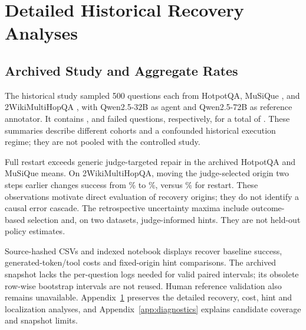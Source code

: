 \documentclass{article}
\begin{document}
\section{Detailed Historical Recovery Analyses}\label{app:historical_results}
\subsection{Archived Study and Aggregate Rates}
The historical study sampled 500 questions each from HotpotQA, MuSiQue
\citep{trivedi2022musique}, and 2WikiMultiHopQA \citep{ho2020constructing},
with Qwen2.5-32B as agent and Qwen2.5-72B as reference annotator. It contains
\HotpotFailed{}, \MusiqueFailed{} and \WikiFailed{} failed questions,
respectively, for a total of \TotalFailed{}. These summaries describe
different cohorts and a confounded historical execution regime; they are
not pooled with the controlled study.

\begin{table}[t]
\centering
\caption{Archived mean repair success (\%). Judge-targeted rows use the generic
retry hint. The last row is a retrospective maximum over the evaluated
uncertainty grid, including informed variants; it is not a held-out policy.
Historical budgets require auditing, and valid confidence intervals are pending.}
\label{tab:results}
\small

\end{table}

Full restart exceeds generic judge-targeted repair in the archived HotpotQA
and MuSiQue means. On 2WikiMultiHopQA, moving the judge-selected origin two
steps earlier changes success from \WikiJudge\% to \WikiBacktrack\%,
versus \WikiRestart\% for restart. These observations motivate direct
evaluation of recovery origins; they do not identify a causal error cascade.
The retrospective uncertainty maxima include outcome-based selection and,
on two datasets, judge-informed hints. They are not held-out policy estimates.

Source-hashed CSVs and indexed notebook displays recover baseline success,
generated-token/tool costs and fixed-origin hint comparisons. The archived
snapshot lacks the per-question logs needed for valid paired intervals;
its obsolete row-wise bootstrap intervals are not reused. Human reference
validation also remains unavailable. Appendix~\ref{app:historical_results}
preserves the detailed recovery, cost, hint and localization analyses, and
Appendix~\ref{app:diagnostics} explains candidate coverage and snapshot limits.
\end{document}
